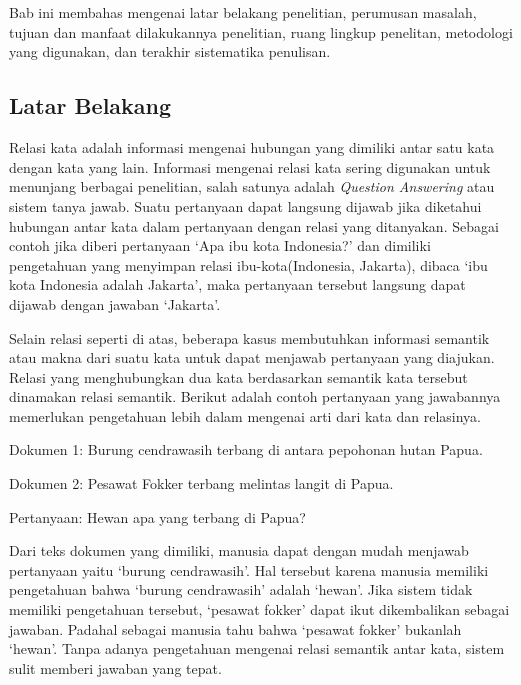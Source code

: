 \chapter{\babSatu}
Bab ini membahas mengenai latar belakang penelitian, perumusan masalah, tujuan dan manfaat dilakukannya penelitian, ruang lingkup penelitan, metodologi yang digunakan, dan terakhir sistematika penulisan. 

%
\section{Latar Belakang}
Relasi kata adalah informasi mengenai hubungan yang dimiliki antar satu kata dengan kata yang lain. Informasi mengenai relasi kata sering digunakan untuk menunjang berbagai penelitian, salah satunya adalah \textit{Question Answering} atau sistem tanya jawab. Suatu pertanyaan dapat langsung dijawab jika diketahui hubungan antar kata dalam pertanyaan dengan relasi yang ditanyakan. Sebagai contoh jika diberi pertanyaan `Apa ibu kota Indonesia?' dan dimiliki pengetahuan yang menyimpan relasi ibu-kota(Indonesia, Jakarta), dibaca `ibu kota Indonesia adalah Jakarta', maka pertanyaan tersebut langsung dapat dijawab dengan jawaban `Jakarta'.

Selain relasi seperti di atas, beberapa kasus membutuhkan informasi semantik atau makna dari suatu kata untuk dapat menjawab pertanyaan yang diajukan. Relasi yang menghubungkan dua kata berdasarkan semantik kata tersebut dinamakan relasi semantik. Berikut adalah contoh pertanyaan yang jawabannya memerlukan pengetahuan lebih dalam mengenai arti dari kata dan relasinya.

Dokumen 1: Burung cendrawasih terbang di antara pepohonan hutan Papua.

Dokumen 2: Pesawat Fokker terbang melintas langit di Papua.

Pertanyaan: Hewan apa yang terbang di Papua?

\noindent Dari teks dokumen yang dimiliki, manusia dapat dengan mudah menjawab pertanyaan yaitu `burung cendrawasih'. Hal tersebut karena manusia memiliki pengetahuan bahwa `burung cendrawasih' adalah `hewan'. Jika sistem tidak memiliki pengetahuan tersebut, `pesawat fokker' dapat ikut dikembalikan sebagai jawaban. Padahal sebagai manusia tahu bahwa `pesawat fokker' bukanlah `hewan'. Tanpa adanya pengetahuan mengenai relasi semantik antar kata, sistem sulit memberi jawaban yang tepat.

